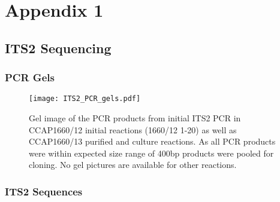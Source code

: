 \graphicspath{{appendices/appendix_1/figures/}}
\chapter{Appendix 1}

\section{ITS2 Sequencing}
\label{sec:app_its2}

\subsection{PCR Gels}
\begin{figure}[H]
    \centering
    \texttt{[image: ITS2\_PCR\_gels.pdf]}
    \caption[Gel images of ITS2 PCR from CCAP1660/12 and CCAP1660/13 reactions]{
        Gel image of the PCR products from initial ITS2 PCR in CCAP1660/12 initial reactions (1660/12 1-20) 
as well as CCAP1660/13 purified and culture reactions. As all PCR products were within expected
size range of 400bp products were pooled for cloning. No gel pictures are available for other reactions.} 
\label{fig:endo_annot}
\end{figure}

\subsection{ITS2 Sequences}


